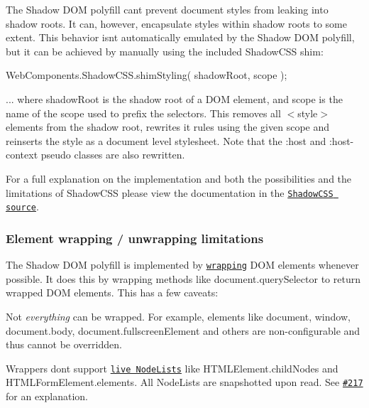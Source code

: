 The Shadow D\+OM polyfill can\textquotesingle{}t prevent document styles from leaking into shadow roots. It can, however, encapsulate styles within shadow roots to some extent. This behavior isn\textquotesingle{}t automatically emulated by the Shadow D\+OM polyfill, but it can be achieved by manually using the included Shadow\+C\+SS shim\+:


\begin{DoxyCode}
WebComponents.ShadowCSS.shimStyling( shadowRoot, scope );
\end{DoxyCode}


... where {\ttfamily shadow\+Root} is the shadow root of a D\+OM element, and {\ttfamily scope} is the name of the scope used to prefix the selectors. This removes all {\ttfamily $<$style$>$} elements from the shadow root, rewrites it rules using the given scope and reinserts the style as a document level stylesheet. Note that the {\ttfamily \+:host} and {\ttfamily \+:host-\/context} pseudo classes are also rewritten.

For a full explanation on the implementation and both the possibilities and the limitations of Shadow\+C\+SS please view the documentation in the \href{src/ShadowCSS/ShadowCSS.js}{\tt Shadow\+C\+SS source}.

\subsubsection*{Element wrapping / unwrapping limitations }

The Shadow D\+OM polyfill is implemented by \href{http://webcomponents.org/polyfills/shadow-dom/#wrappers}{\tt wrapping} D\+OM elements whenever possible. It does this by wrapping methods like {\ttfamily document.\+query\+Selector} to return wrapped D\+OM elements. This has a few caveats\+:
\begin{DoxyItemize}
\item Not {\itshape everything} can be wrapped. For example, elements like {\ttfamily document}, {\ttfamily window}, {\ttfamily document.\+body}, {\ttfamily document.\+fullscreen\+Element} and others are non-\/configurable and thus cannot be overridden.
\item Wrappers don\textquotesingle{}t support \href{https://developer.mozilla.org/en-US/docs/Web/API/NodeList#A_sometimes-live_collection}{\tt live Node\+Lists} like {\ttfamily H\+T\+M\+L\+Element.\+child\+Nodes} and {\ttfamily H\+T\+M\+L\+Form\+Element.\+elements}. All Node\+Lists are snapshotted upon read. See \href{https://github.com/webcomponents/webcomponentsjs/issues/217}{\tt \#217} for an explanation.
\end{DoxyItemize}

